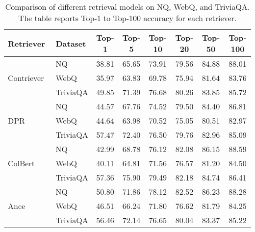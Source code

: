 



\begin{table}[!ht]
\caption{Comparison of different retrieval models on NQ, WebQ, and TriviaQA. The table reports Top-1 to Top-100 accuracy for each retriever.}
\scriptsize
\centering
\begin{tabular}{@{}llcccccc@{}}
\toprule
Retriever & Dataset & Top-1 & Top-5 & Top-10 & Top-20 & Top-50 & Top-100 \\
\midrule




\multirow{3}{*}{Contriever~\cite{izacard2021contriever}} & NQ              & 38.81 & 65.65 & 73.91 & 79.56 & 84.88 & 88.01 \\
           & WebQ          & 35.97 & 63.83 & 69.78 & 75.94 & 81.64 & 83.76 \\
           & TriviaQA        & 49.85 & 71.39 & 76.68 & 80.26 & 83.85 & 85.72 \\

\midrule


\multirow{3}{*}{DPR~\cite{dpr}}        & NQ              & 44.57 & 67.76 & 74.52 & 79.50 & 84.40 & 86.81 \\
           & WebQ            & 44.64 & 63.98 & 70.52 & 75.05 & 80.51 & 82.97 \\
           & TriviaQA        & 57.47 & 72.40 & 76.50 & 79.76 & 82.96 & 85.09 \\
\midrule
\multirow{3}{*}{ColBert~\cite{santhanam2021colbertv2}}        & NQ  & 42.99 & 68.78 & 76.12 & 82.08 & 86.15 & 88.59 \\
           & WebQ    & 40.11 & 64.81 & 71.56 & 76.57 & 81.20 & 84.50 \\
           & TriviaQA            & 57.36 & 75.90 & 79.49 & 82.18 & 84.74 & 86.41 \\
\midrule
\multirow{3}{*}{Ance~\cite{ance}}        & NQ       &       50.80 & 71.86 & 78.12 & 82.52 & 86.23 & 88.28 \\
           & WebQ                & 46.51 & 66.24 & 71.80 & 76.62 & 81.79 & 84.25 \\
           & TriviaQA           & 56.46 & 72.14 & 76.65 & 80.04 & 83.37 & 85.22\\


\end{tabular}
\end{table}
